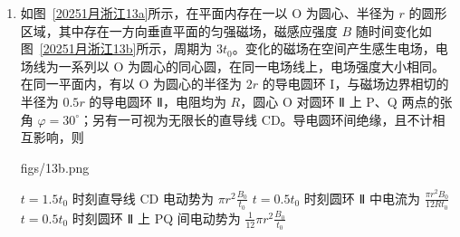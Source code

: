 \documentclass[\gkver]{gaokaozhenti}
\begin{document}
\begin{enumerate}
{D．当右侧波传到 $x = 6 \Um$ 位置时用时间为 $0.1 \Us = 5T$，即此时 $x = 6 \Um$ 处质点从平衡位置向上振动；

此时 $x = 0$ 处的波源 $S_{1}$ 也在平衡位置向上振动，即振动方向相同，可知在 $0 < x < 6 \Um$ 内到 $x = 0$ 和 $x = 6 \Um$ 两点的路程差为波长整数倍时振动加强，波在该区间内的波长 $\lambda_{1} = v_{1}T = 40 \times 0.02 \Um = 0.8 \Um$

可知 $x - (6 - x) = n\lambda = 0.8n$

即 $x = 3 + 0.4n$

其中 $n$ 取 0、$\pm 1$、$\pm 2$、$\pm 3$、$\pm 4$、$\pm 5$、$\pm 6$、$\pm 7$

则共有 15 个振动加强点，选项 D 错误。

故选 BC。
}

\item
如图~\ref{20251月浙江13a}所示，在平面内存在一以 O 为圆心、半径为 $r$ 的圆形区域，其中存在一方向垂直平面的匀强磁场，磁感应强度 $B$ 随时间变化如图~\ref{20251月浙江13b}所示，周期为 $3t_{0}$。变化的磁场在空间产生感生电场，电场线为一系列以 O 为圆心的同心圆，在同一电场线上，电场强度大小相同。在同一平面内，有以 O 为圆心的半径为 $2r$ 的导电圆环 I，与磁场边界相切的半径为 $0.5r$ 的导电圆环 Ⅱ，电阻均为 $R$，圆心 O 对圆环 Ⅱ 上 P、Q 两点的张角 $\varphi = 30^{\circ}$；另有一可视为无限长的直导线 CD。导电圆环间绝缘，且不计相互影响，则

{figs/13b.png}

{$t = 1.5t_{0}$ 时刻直导线 CD 电动势为 $\pi r^{2}\frac{B_{0}}{t_{0}}$}
{$t = 0.5t_{0}$ 时刻圆环 Ⅱ 中电流为 $\frac{\pi r^{2}B_{0}}{12Rt_{0}}$}
{$t = 0.5t_{0}$ 时刻圆环 Ⅱ 上 PQ 间电动势为 $\frac{1}{12}\pi r^{2}\frac{B_{0}}{t_{0}}$}

\end{enumerate}
\end{document}
